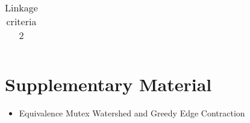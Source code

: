 \documentclass[10pt,twocolumn,letterpaper]{article}
\begin{document}
\begin{table*}[t]
\begin{subtable}[t!]{0.98\textwidth}
\begin{tabular}{c | c }




            
        \end{tabular}
        \label{tab:linkage-criteria}
    \end{subtable} 
    \caption{Linkage criteria 2}
\end{table*}

{\small


}

\section{Supplementary Material}
\begin{itemize}
\item Equivalence Mutex Watershed and Greedy Edge Contraction
\end{itemize}
\end{document}
